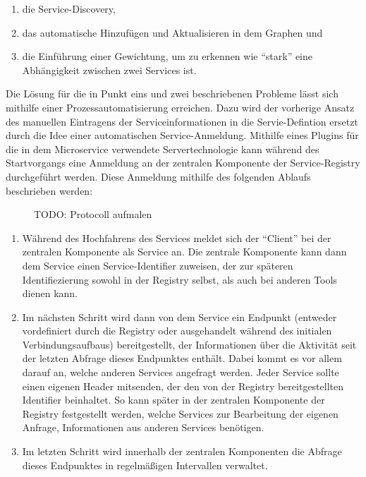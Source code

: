 \begin{enumerate}
	\item die Service-Discovery,
	\item das automatische Hinzufügen und Aktualisieren in dem Graphen und
	\item die Einführung einer Gewichtung, um zu erkennen wie \enquote{stark} eine Abhängigkeit zwischen zwei Services ist.
\end{enumerate}

Die Lösung für die in Punkt eins und zwei beschriebenen Probleme lässt sich mithilfe einer Prozessautomatisierung erreichen. Dazu wird der vorherige Ansatz des manuellen Eintragens der Serviceinformationen in die Servie-Defintion ersetzt durch die Idee einer automatischen Service-Anmeldung. Mithilfe eines Plugins für die in dem Microservice verwendete Servertechnologie kann während des Startvorgangs eine Anmeldung an der zentralen Komponente der Service-Registry durchgeführt werden. Diese Anmeldung mithilfe des folgenden Ablaufs beschrieben werden:

\begin{figure}[h]
	\centering
	
	\caption{TODO: Protocoll aufmalen}
\end{figure}

\begin{enumerate}
	\item Während des Hochfahrens des Services meldet sich der \enquote{Client} bei der zentralen Komponente als Service an. Die zentrale Komponente kann dann dem Service einen Service-Identifier zuweisen, der zur späteren Identifiezierung sowohl in der Registry selbst, als auch bei anderen Tools dienen kann.
	\item Im nächsten Schritt wird dann von dem Service ein Endpunkt (entweder vordefiniert durch die Registry oder ausgehandelt während des initialen Verbindungsaufbaus) bereitgestellt, der Informationen über die Aktivität seit der letzten Abfrage dieses Endpunktes enthält. Dabei kommt es vor allem darauf an, welche anderen Services angefragt werden. Jeder Service sollte einen eigenen Header mitsenden, der den von der Registry bereitgestellten Identifier beinhaltet. So kann später in der zentralen Komponente der Registry festgestellt werden, welche Services zur Bearbeitung der eigenen Anfrage, Informationen aus anderen Services benötigen.
	\item Im letzten Schritt wird innerhalb der zentralen Komponenten die Abfrage dieses Endpunktes in regelmäßigen Intervallen verwaltet.
\end{enumerate}

